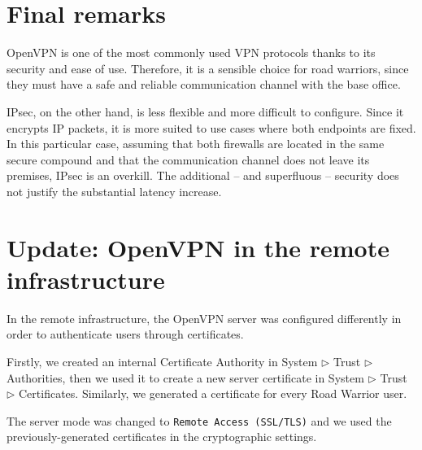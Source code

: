 \documentclass{homework}
\begin{document}
    
    \section{Final remarks}
    OpenVPN is one of the most commonly used VPN protocols thanks to its security and ease of use.
    Therefore, it is a sensible choice for road warriors, since they must have a safe and reliable communication channel with the base office.
    
    IPsec, on the other hand, is less flexible and more difficult to configure.
    Since it encrypts IP packets, it is more suited to use cases where both endpoints are fixed.
    In this particular case, assuming that both firewalls are located in the same secure compound and that the communication channel does not leave its premises, IPsec is an overkill.
    The additional -- and superfluous -- security does not justify the substantial latency increase.
    
    \section{Update: OpenVPN in the remote infrastructure}
    In the remote infrastructure, the OpenVPN server was configured differently in order to authenticate users through certificates.
    
    Firstly, we created an internal Certificate Authority in System $\triangleright$ Trust $\triangleright$ Authorities, then we used it to create a new server certificate in System $\triangleright$ Trust $\triangleright$ Certificates.
    Similarly, we generated a certificate for every Road Warrior user.
    
    The server mode was changed to \texttt{Remote Access (SSL/TLS)} and we used the previously-generated certificates in the cryptographic settings. 
\end{document}
